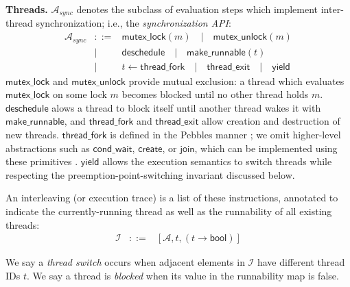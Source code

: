 {\bf Threads.}
$\mathcal{A}_{sync}$ denotes the subclass of evaluation steps which implement inter-thread synchronization; i.e., the {\em synchronization API}:
\begin{eqnarray*}
	\mathcal{A}_{sync} &::=& \mathsf{mutex\_lock}(m) \quad | \quad \mathsf{mutex\_unlock}(m) \\
		&|& \mathsf{deschedule} \quad | \quad \mathsf{make\_runnable}(t) \\
		&|& t \leftarrow \mathsf{thread\_fork} \quad | \quad \mathsf{thread\_exit} \quad | \quad \mathsf{yield}
\end{eqnarray*}
$\mathsf{mutex\_lock}$ and
$\mathsf{mutex\_unlock}$ provide mutual exclusion:
a thread which evaluates $\mathsf{mutex\_lock}$ on some lock $m$ becomes blocked until no other thread holds $m$.
$\mathsf{deschedule}$ alows a thread to block itself until another thread wakes it with $\mathsf{make\_runnable}$,
%
and $\mathsf{thread\_fork}$ and $\mathsf{thread\_exit}$ allow creation and destruction of new threads.
$\mathsf{thread\_fork}$ is defined in the Pebbles manner \cite{kspec};
we omit higher-level abstractions such as $\mathsf{cond\_wait}$, $\mathsf{create}$, or $\mathsf{join}$, which can be implemented using these primitives \cite{thrlib}.
$\mathsf{yield}$
allows the execution semantics to switch threads %
while respecting the preemption-point-switching invariant discussed below.

\begin{definition}[Interleaving]
An interleaving (or execution trace) is a list of these instructions, annotated to indicate the currently-running thread as well as the runnability of all existing threads:
\begin{eqnarray*}
	\mathcal{I} &::=& [\mathcal{A}, t, (t \rightarrow \mathsf{bool})]
\end{eqnarray*}
\end{definition}

We say a {\em thread switch} occurs when adjacent elements in $\mathcal{I}$ have different thread IDs $t$.
%
We say a thread is {\em blocked} when its value in the runnability map is false.

